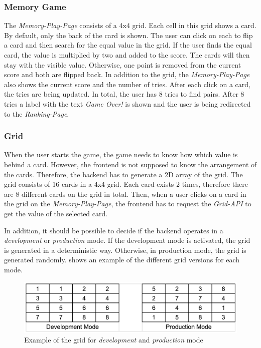 \subsubsection{Memory Game}\label{subsubsec:02_design_backend_game}
The \textit{Memory-Play-Page} consists of a 4x4 grid. Each cell in this grid shows a card. By default, only the back of the card is shown.
The user can click on each to flip a card and then search for the equal value in the grid. If the user finds the equal card, the value is multiplied by two and added to the score. The cards will then stay with the visible value. Otherwise, one point is removed from the current score and both are flipped back.
In addition to the grid, the \textit{Memory-Play-Page} also shows the current score and the number of tries.
After each click on a card, the tries are being updated. In total, the user has 8 tries to find pairs. After 8 tries a label with the text \textit{Game Over!} is shown and the user is being redirected to the \textit{Ranking-Page}.

\subsubsection{Grid}\label{subsubsec:02_design_backend_grid}
When the user starts the game, the game needs to know how which value is behind a card. However, the frontend is not supposed to know the arrangement of the cards. 
Therefore, the backend has to generate a 2D array of the grid.
The grid consists of 16 cards in a 4x4 grid. Each card exists 2 times, therefore there are 8 different cards on the grid in total.
Then, when a user clicks on a card in the grid on the \textit{Memory-Play-Page}, the frontend has to request the \textit{Grid-API} to get the value of the selected card.

In addition, it should be possible to decide if the backend operates in a \textit{development} or \textit{production} mode.
If the development mode is activated, the grid is generated in a deterministic way.
Otherwise, in production mode, the grid is generated randomly.
 shows an example of the different grid versions for each mode.
\begin{figure}[h]
\centering
\includegraphics[scale=0.2]{images/02_design/backend/grid-dev-prod-mode.png}
\caption{Example of the grid for \textit{development} and \textit{production} mode}
\label{fig:02_design_backend_grid_grid}
\end{figure}


